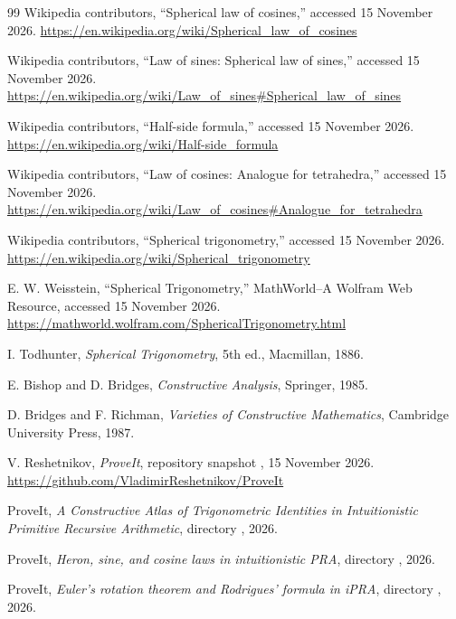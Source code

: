 \documentclass[11pt]{article}
\theoremstyle{definition}
\newcommand{\code}[1]{\texttt{\detokenize{#1}}}
\begin{document}
















\begin{thebibliography}{99}
Wikipedia contributors, ``Spherical law of cosines,'' accessed 15 November 2026.
\url{https://en.wikipedia.org/wiki/Spherical_law_of_cosines}

Wikipedia contributors, ``Law of sines: Spherical law of sines,'' accessed 15 November 2026.
\url{https://en.wikipedia.org/wiki/Law_of_sines#Spherical_law_of_sines}

Wikipedia contributors, ``Half-side formula,'' accessed 15 November 2026.
\url{https://en.wikipedia.org/wiki/Half-side_formula}

Wikipedia contributors, ``Law of cosines: Analogue for tetrahedra,'' accessed 15 November 2026.
\url{https://en.wikipedia.org/wiki/Law_of_cosines#Analogue_for_tetrahedra}

Wikipedia contributors, ``Spherical trigonometry,'' accessed 15 November 2026.
\url{https://en.wikipedia.org/wiki/Spherical_trigonometry}

E. W. Weisstein, ``Spherical Trigonometry,'' MathWorld--A Wolfram Web Resource,
accessed 15 November 2026.
\url{https://mathworld.wolfram.com/SphericalTrigonometry.html}

I. Todhunter, \emph{Spherical Trigonometry}, 5th ed., Macmillan, 1886.

E. Bishop and D. Bridges, \emph{Constructive Analysis}, Springer, 1985.

D. Bridges and F. Richman, \emph{Varieties of Constructive Mathematics},
Cambridge University Press, 1987.

V. Reshetnikov, \emph{ProveIt}, repository snapshot
\code{a3c053cc6243}, 15 November 2026.
\url{https://github.com/VladimirReshetnikov/ProveIt}

ProveIt, \emph{A Constructive Atlas of Trigonometric Identities in Intuitionistic
Primitive Recursive Arithmetic}, directory
, 2026.

ProveIt, \emph{Heron, sine, and cosine laws in intuitionistic PRA}, directory
, 2026.

ProveIt, \emph{Euler's rotation theorem and Rodrigues' formula in iPRA}, directory
, 2026.
\end{thebibliography}
\end{document}
